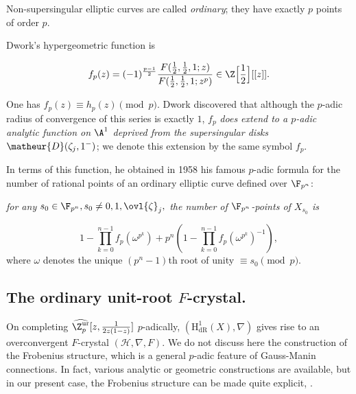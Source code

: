 Non-supersingular elliptic curves are called {\it ordinary}; they have
exactly $p$ points of order $p$.

Dwork's hypergeometric function is

\begin{equation*}
f_p(z)=
(-1)^\frac{p-1}{2}\frac{F(\frac{1}{2},\frac{1}{2},1;z)}
{F(\frac{1}{2},\frac{1}{2},1;z^p)}\in {\Z}\Bigl[\frac{1}{2}\Bigr][[z]].
\end{equation*}

One has $f_p(z)\equiv h_p(z)\pmod{p}$. Dwork discovered that although
the $p$-adic radius of convergence of this series is exactly $1$, $f_p$
\emph{does extend to a $p$-adic analytic function on ${\A}^1$ deprived
from the supersingular disks} $\matheur{D}(\zeta_j,1^-)$; we denote this
extension by the same symbol $f_p$.

In terms of this function, he obtained in 1958 his famous $p$-adic 
formula for the number of
rational points of an ordinary elliptic curve defined over ${\F}_{p^n}$:

\emph{for any $s_0\in {\F}_{p^n}, s_0\neq 0,1,\ovl{\zeta}_j,$
 the number of ${\F}_{p^n}$-points of $X_{s_0}$ is}

\begin{equation*}
1 - \prod_{k=0}^{n-1} f_p(\omega^{p^k}) +
 p^n \left(1 - \prod_{k=0}^{n-1} f_p(\omega^{p^k})^{-1}\right),
\end{equation*}
where $\omega$ denotes the unique $(p^n-1)$th root of unity $\equiv s_0
\pmod{p}$.

\subsection{The ordinary unit-root $F$-crystal.}\label{sub-ordinary-unit-root}

On completing $\widehat{{\Z}_p^{\mathrm{ur}}}[z,\frac{1}{{2z(1-z)}}]$
$p$-adically, $(\mathrm{H}^1_{\mathrm{dR}}(X), \nabla)$ gives rise to an
overconvergent $F$-crystal $(\mathcal{H}, \nabla, F)$. We do not discuss
here the construction of the Frobenius structure, which is a general
$p$-adic feature of Gauss-Manin connections. In fact, various analytic
or geometric constructions are available, but in our present case, the
Frobenius structure can be made quite explicit, \cf \cite{pc}.

